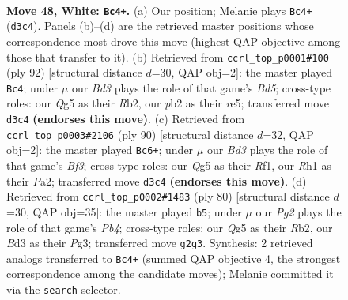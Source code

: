 \documentclass[11pt]{article}
\begin{document}
\clearpage

\begin{figure}[p]\centering
\begin{subfigure}{0.46\textwidth}\centering
\resizebox{\linewidth}{!}{%
\newchessgame
\chessboard[
  setfen={5r2/1b3k2/8/6Q1/8/3B3P/1p4P1/6KR w - - 5 48},
  showmover=false,
  pgfstyle=straightmove, color=movearrow, markmove={d3-c4}
]}
\caption{}
\end{subfigure}\hfill
\begin{subfigure}{0.46\textwidth}\centering
\resizebox{\linewidth}{!}{%
\newchessgame
\chessboard[
  setfen={8/6k1/6p1/2bBr3/8/6PK/1R3P2/8 w - - 15 47},
  showmover=false,
  pgfstyle=straightmove, color=movearrow, markmove={d5-c4}
]}
\caption{}
\end{subfigure}
\\[4pt]
\begin{subfigure}{0.46\textwidth}\centering
\resizebox{\linewidth}{!}{%
\newchessgame
\chessboard[
  setfen={4k3/4b3/8/8/8/5Brp/PP6/1K3R2 w - - 2 46},
  showmover=false,
  pgfstyle=straightmove, color=movearrow, markmove={f3-c6}
]}
\caption{}
\end{subfigure}\hfill
\begin{subfigure}{0.46\textwidth}\centering
\resizebox{\linewidth}{!}{%
\newchessgame
\chessboard[
  setfen={1r6/6pp/8/4k3/1P2p3/2K3P1/1R5P/8 w - - 8 41},
  showmover=false,
  pgfstyle=straightmove, color=movearrow, markmove={b4-b5}
]}
\caption{}
\end{subfigure}
\caption{\textbf{Move 48, White: \texttt{Bc4+}.} (a) Our position; Melanie plays \texttt{Bc4+} (\texttt{d3c4}). Panels (b)--(d) are the retrieved master positions whose correspondence most drove this move (highest QAP objective among those that transfer to it). (b) Retrieved from \texttt{ccrl\_top\_p0001\#100} (ply 92) [structural distance $d$=30, QAP obj=2]: the master played \texttt{Bc4}; under $\mu$ our \emph{Bd3} plays the role of that game's \emph{Bd5}; cross-type roles: our \emph{Q}g5 as their \emph{R}b2, our \emph{p}b2 as their \emph{r}e5; transferred move \texttt{d3c4} \textbf{(endorses this move)}. (c) Retrieved from \texttt{ccrl\_top\_p0003\#2106} (ply 90) [structural distance $d$=32, QAP obj=2]: the master played \texttt{Bc6+}; under $\mu$ our \emph{Bd3} plays the role of that game's \emph{Bf3}; cross-type roles: our \emph{Q}g5 as their \emph{R}f1, our \emph{R}h1 as their \emph{P}a2; transferred move \texttt{d3c4} \textbf{(endorses this move)}. (d) Retrieved from \texttt{ccrl\_top\_p0002\#1483} (ply 80) [structural distance $d$=30, QAP obj=35]: the master played \texttt{b5}; under $\mu$ our \emph{Pg2} plays the role of that game's \emph{Pb4}; cross-type roles: our \emph{Q}g5 as their \emph{R}b2, our \emph{B}d3 as their \emph{P}g3; transferred move \texttt{g2g3}. Synthesis: 2 retrieved analogs transferred to \texttt{Bc4+} (summed QAP objective 4, the strongest correspondence among the candidate moves); Melanie committed it via the \texttt{search} selector.}
\label{fig:thought-m94}
\end{figure}
\end{document}

